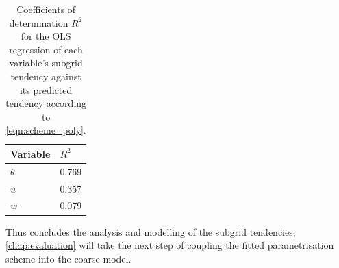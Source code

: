 \documentclass[../main.tex]{subfiles}
\begin{document}
\begin{table}[ht]
\centering
\begin{tabular}{l l}
    \toprule
    Variable & $R^2$ \\
    \midrule
    $\theta$ & 0.769 \\
    $u$ & 0.357 \\
    $w$ & 0.079 \\
    \bottomrule
\end{tabular}
\caption{
    Coefficients of determination $R^2$ for the OLS regression of each
    variable's subgrid tendency against its predicted tendency according to
    \cref{eqn:scheme_poly}.
}
\label{tab:r_squared}
\end{table}

Thus concludes the analysis and modelling of the subgrid tendencies;
\cref{chap:evaluation} will take the next step of coupling the fitted
parametrisation scheme into the coarse model.


\ifSubfilesClassLoaded{%
    \emergencystretch=5em
    \printbibliography{}
}{}
\end{document}
